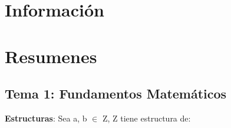 \documentclass[12pt, twoside, openright]{report} %
\begin{document}





\part{Información}






\part{Resumenes}
\chapter{Tema 1: Fundamentos Matemáticos}

  \textbf{Estructuras}: Sea a, b $\in$ Z, Z tiene estructura de:
  
\end{document}
